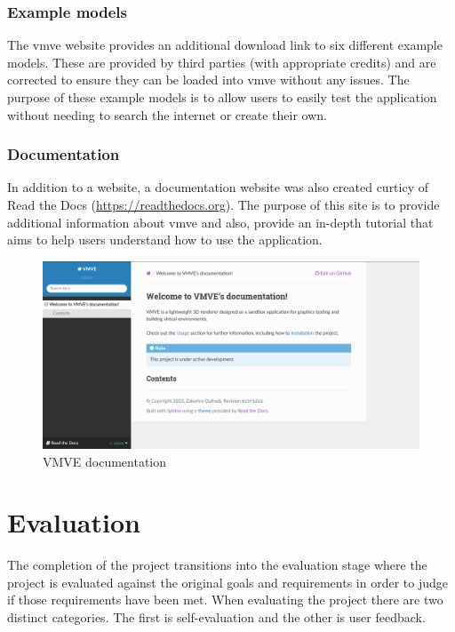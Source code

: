 \documentclass[11pt]{article}
\begin{document}
\subsubsection{Example models}
The \gls*{vmve} website provides an additional download link to six different example
models. These are provided by third parties (with appropriate credits) and are
corrected to ensure they can be loaded into \gls*{vmve} without any issues. The purpose
of these example models is to allow users to easily test the application without
needing to search the internet or create their own.


\subsubsection{Documentation}
In addition to a website, a documentation website was also created curticy of
Read the Docs (\href{https://readthedocs.org}{https://readthedocs.org}). The
purpose of this site is to provide additional information about \gls*{vmve} and
also, provide an in-depth tutorial that aims to help users understand how to use
the application.

\begin{figure}[H]
  \centering
  \includegraphics[width=\textwidth]{images/documentation.png}
  \caption{VMVE documentation}
  \label{fig:documentation}
\end{figure}


\clearpage
\section{Evaluation}
The completion of the project transitions into the evaluation stage where the
project is evaluated against the original goals and requirements in order to
judge if those requirements have been met. When evaluating the project there are
two distinct categories. The first is self-evaluation and the other is user
feedback.
\end{document}

